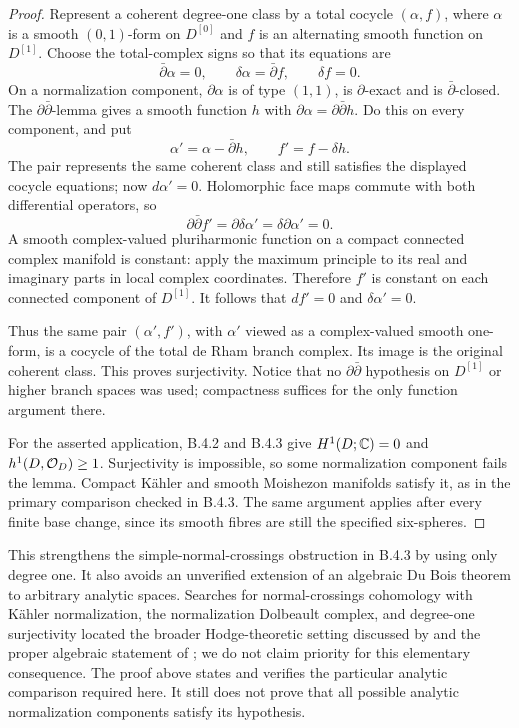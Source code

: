 \begin{proof}
Represent a coherent degree-one class by a total cocycle
$(\alpha,f)$, where $\alpha$ is a smooth $(0,1)$-form on
$D^{[0]}$ and $f$ is an alternating smooth function on
$D^{[1]}$. Choose the total-complex signs so that its equations
are
\[
 \bar\partial\alpha=0,\qquad
 \delta\alpha=\bar\partial f,\qquad \delta f=0.
\]
On a normalization component, $\partial\alpha$ is of type
$(1,1)$, is $\partial$-exact and is $\bar\partial$-closed.
The $\partial\bar\partial$-lemma gives a smooth function $h$
with $\partial\alpha=\partial\bar\partial h$.
Do this on every component, and put
\[
 \alpha'=\alpha-\bar\partial h,\qquad
 f'=f-\delta h.
\]
The pair represents the same coherent class and still satisfies
the displayed cocycle equations; now $d\alpha'=0$.
Holomorphic face maps commute with both differential operators,
so
\[
 \partial\bar\partial f'
       =\partial\delta\alpha'=\delta\partial\alpha'=0.
\]
A smooth complex-valued pluriharmonic function on a compact
connected complex manifold is constant: apply the maximum
principle to its real and imaginary parts in local complex
coordinates. Therefore $f'$ is constant on each connected
component of $D^{[1]}$. It follows that
$df'=0$ and $\delta\alpha'=0$.

Thus the same pair $(\alpha',f')$, with $\alpha'$ viewed as
a complex-valued smooth one-form, is a cocycle of the total
de Rham branch complex. Its image is the original coherent
class. This proves surjectivity. Notice that no
$\partial\bar\partial$ hypothesis on $D^{[1]}$ or higher
branch spaces was used; compactness suffices for the only
function argument there.

For the asserted application, B.4.2 and B.4.3 give
$H^1(D;\mathbb C)=0$ and $h^1(D,\mathcal O_D)\geq1$.
Surjectivity is impossible, so some normalization component
fails the lemma. Compact K\"ahler and smooth Moishezon
manifolds satisfy it, as in the primary comparison checked
in B.4.3. The same argument applies after every finite base
change, since its smooth fibres are still the specified
six-spheres.
\end{proof}

This strengthens the simple-normal-crossings obstruction in
B.4.3 by using only degree one. It also avoids an unverified
extension of an algebraic Du Bois theorem to arbitrary analytic
spaces. Searches for normal-crossings cohomology with K\"ahler
normalization, the normalization Dolbeault complex, and
degree-one surjectivity located the broader Hodge-theoretic
setting discussed by \citet{Chen2026HodgeRoot} and the proper
algebraic statement of \citet{GrafKovacs2014Root}; we do not
claim priority for this elementary consequence. The proof above
states and verifies the particular analytic comparison required
here. It still does not prove that all possible analytic
normalization components satisfy its hypothesis.
